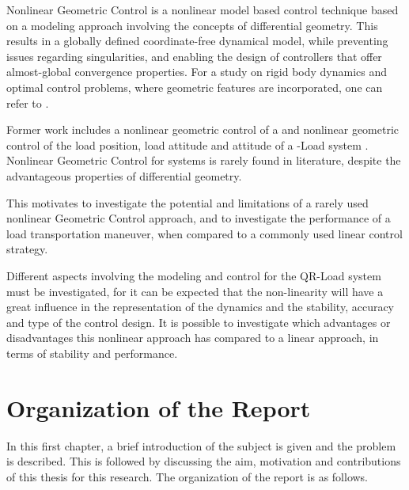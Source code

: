 
Nonlinear Geometric Control is a nonlinear model based control technique based on a modeling approach involving the concepts of differential geometry. This results in a globally defined coordinate-free dynamical model, while preventing issues regarding singularities, and enabling the design of controllers that offer almost-global convergence properties. %
For a study on rigid body dynamics and optimal control problems, where geometric features are incorporated, one can refer to \cite{Lee2008}. 

Former work includes a nonlinear geometric control of a  \cite{Lee2010,Goodarzi2013a} and nonlinear geometric control of the load position, load attitude and  attitude of a -Load system \cite{Sreenath2013a,Sreenath2013b,Tang2014}.
Nonlinear Geometric Control for  systems is rarely found in literature, despite the advantageous properties of differential geometry. 

This motivates to investigate the potential and limitations of a rarely used nonlinear Geometric Control approach, and to investigate the performance of a load transportation maneuver, when compared to a commonly used linear control strategy.

Different aspects involving the modeling and control for the QR-Load system must be investigated, for it can be expected that the non-linearity will have a great influence in the representation of the dynamics and the stability, accuracy and type of the control design.
It is possible to investigate which advantages or disadvantages this nonlinear approach has compared to a linear approach, in terms of stability and performance.

%

\section{Organization of the Report}

In this first chapter, a brief introduction of the subject is given and the problem is described. This is followed by discussing the aim, motivation and contributions of this thesis for this research. The organization of the report is as follows.

